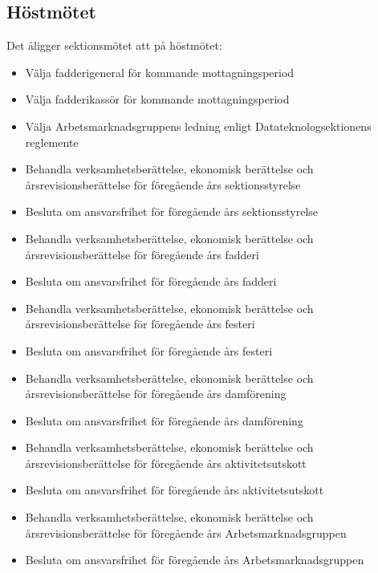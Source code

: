 \documentclass{datateknologsektionen-document}
\begin{document}
\subsection{Höstmötet}
Det åligger sektionsmötet att på höstmötet:
\begin{itemize}
  \item Välja fadderigeneral för kommande mottagningsperiod
  \item Välja fadderikassör för kommande mottagningsperiod
  \item Välja Arbetsmarknadsgruppens ledning enligt Datateknologsektionens reglemente
  \item Behandla verksamhetsberättelse, ekonomisk berättelse och årsrevisionsberättelse för föregående års sektionsstyrelse
  \item Besluta om ansvarsfrihet för föregående års sektionsstyrelse
  \item Behandla verksamhetsberättelse, ekonomisk berättelse och årsrevisionsberättelse för föregående års fadderi
  \item Besluta om ansvarsfrihet för föregående års fadderi
  \item Behandla verksamhetsberättelse, ekonomisk berättelse och årsrevisionsberättelse för föregående års festeri
  \item Besluta om ansvarsfrihet för föregående års festeri
  \item Behandla verksamhetsberättelse, ekonomisk berättelse och årsrevisionsberättelse för föregående års damförening
  \item Besluta om ansvarsfrihet för föregående års damförening
  \item Behandla verksamhetsberättelse, ekonomisk berättelse och årsrevisionsberättelse för föregående års aktivitetsutskott
  \item Besluta om ansvarsfrihet för föregående års aktivitetsutskott
  \item Behandla verksamhetsberättelse, ekonomisk berättelse och årsrevisionsberättelse för föregående års Arbetsmarknadsgruppen
  \item Besluta om ansvarsfrihet för föregående års Arbetsmarknadsgruppen
\end{itemize}
\end{document}
